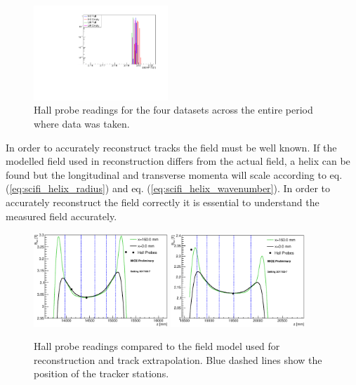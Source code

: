 \begin{figure}[!tbh]
    \includegraphics*[width=0.45\textwidth]{03-Detectors/Figures/hall-probes_2017-02-7/hp_72.pdf}
    \caption{Hall probe readings for the four datasets across the entire period where data was taken.}
\label{fig:hall_probes}
\end{figure}

In order to accurately reconstruct tracks the field must be well known. If the
modelled field used in reconstruction differs from the actual field, a helix
can be found but the longitudinal and transverse momenta will scale according to
eq. (\ref{eq:scifi_helix_radius}) and eq. (\ref{eq:scifi_helix_wavenumber}). In 
order to accurately reconstruct the field correctly it is essential to 
understand the measured field accurately.

\begin{figure}[!tbh]
    \centering
    \includegraphics*[width=0.45\textwidth]{03-Detectors/Figures/HallProbes/bfield_vs_z_ssu.eps}
    \includegraphics*[width=0.45\textwidth]{03-Detectors/Figures/HallProbes/bfield_vs_z_ssd.eps}
    \caption{Hall probe readings compared to the field model used for 
             reconstruction and track extrapolation. Blue dashed lines show the
             position of the tracker stations.}
\label{fig:field_map}
\end{figure}

